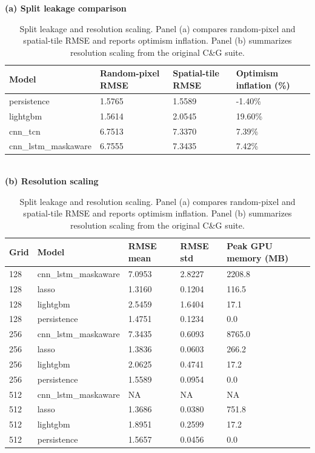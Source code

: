\documentclass[11pt]{article}
\begin{document}
\begin{table}[p]
\centering
\caption{Split leakage and resolution scaling. Panel (a) compares random-pixel and spatial-tile RMSE and reports optimism inflation. Panel (b) summarizes resolution scaling from the original C\&G suite.}
\label{tab:t7}
\textbf{(a) Split leakage comparison}\\[0.3em]
\begin{tabular}{p{3.0cm}p{2.2cm}p{2.2cm}p{2.6cm}}
\toprule
Model & Random-pixel RMSE & Spatial-tile RMSE & Optimism inflation (\%)\\
\midrule
persistence & 1.5765 & 1.5589 & -1.40\%\\
lightgbm & 1.5614 & 2.0545 & 19.60\%\\
cnn\_tcn & 6.7513 & 7.3370 & 7.39\%\\
cnn\_lstm\_maskaware & 6.7555 & 7.3435 & 7.42\%\\
\bottomrule
\end{tabular}
\\[1.0em]
\textbf{(b) Resolution scaling}\\[0.3em]
\begin{tabular}{p{1.5cm}p{3.0cm}p{1.8cm}p{1.8cm}p{2.2cm}}
\toprule
Grid & Model & RMSE mean & RMSE std & Peak GPU memory (MB)\\
\midrule
128 & cnn\_lstm\_maskaware & 7.0953 & 2.8227 & 2208.8\\
128 & lasso & 1.3160 & 0.1204 & 116.5\\
128 & lightgbm & 2.5459 & 1.6404 & 17.1\\
128 & persistence & 1.4751 & 0.1234 & 0.0\\
256 & cnn\_lstm\_maskaware & 7.3435 & 0.6093 & 8765.0\\
256 & lasso & 1.3836 & 0.0603 & 266.2\\
256 & lightgbm & 2.0625 & 0.4741 & 17.2\\
256 & persistence & 1.5589 & 0.0954 & 0.0\\
512 & cnn\_lstm\_maskaware & NA & NA & NA\\
512 & lasso & 1.3686 & 0.0380 & 751.8\\
512 & lightgbm & 1.8951 & 0.2599 & 17.2\\
512 & persistence & 1.5657 & 0.0456 & 0.0\\
\bottomrule
\end{tabular}
\end{table}
\end{document}
